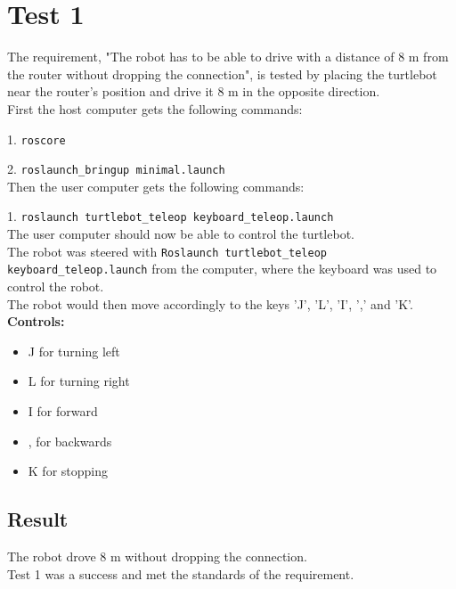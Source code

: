 %
%
%
%

\section{Test 1}
The requirement, "The robot has to be able to drive with a distance of 8 m from the router without dropping the connection", is tested by placing the turtlebot near the router's position and drive it 8 m in the opposite direction.\\ 
\newline
First the host computer gets the following commands:

1. \texttt{roscore}

2. \texttt{roslaunch\_bringup minimal.launch}\\
Then the user computer gets the following commands:

1. \texttt{roslaunch turtlebot\_teleop keyboard\_teleop.launch}\\
The user computer should now be able to control the turtlebot.\\
The robot was steered with \texttt{Roslaunch turtlebot\_teleop keyboard\_teleop.launch} from the computer, where the keyboard was used to control the robot.\\
The robot would then move accordingly to the keys 'J', 'L', 'I', ',' and 'K'.\\
\newline
\textbf{Controls:}
\begin{minipage}[t]{.5\textwidth}
\begin{itemize}
    \item J for turning left
    \item L for turning right
    \item I for forward
\end{itemize}
\end{minipage}
\begin{minipage}[t]{.5\textwidth}
    \begin{itemize}
    \item , for backwards
    \item K for stopping
    \end{itemize}
\end{minipage}

\subsection{Result}
The robot drove 8 m without dropping the connection.\\
Test 1 was a success and met the standards of the requirement.

